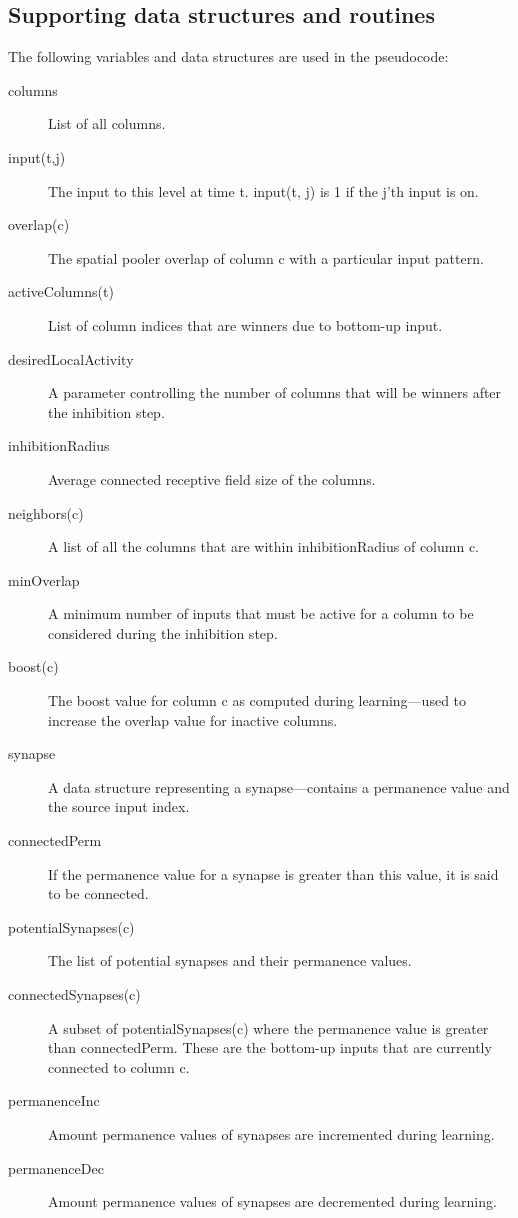 \documentclass{report}
\begin{document}
\subsection*{Supporting data structures and routines}

The following variables and data structures are used in the pseudocode:

\begin{description}
\item[columns] List of all columns.
\item[input(t,j)] The input to this level at time t. input(t, j) is 1
  if the j'th input is on.
\item[overlap(c)] The spatial pooler overlap of column c with a
  particular input pattern.
\item[activeColumns(t)] List of column indices that are winners due to
  bottom-up input.
\item[desiredLocalActivity] A parameter controlling the number of
  columns that will be winners after the inhibition step.
\item[inhibitionRadius] Average connected receptive field size of the
  columns.
\item[neighbors(c)] A list of all the columns that are within
  inhibitionRadius of column c.
\item[minOverlap] A minimum number of inputs that must be active for a
  column to be considered during the inhibition step.
\item[boost(c)] The boost value for column c as computed during
  learning---used to increase the overlap value for inactive columns.
\item[synapse] A data structure representing a synapse---contains a
  permanence value and the source input index.
\item[connectedPerm] If the permanence value for a synapse is greater
  than this value, it is said to be connected.
\item[potentialSynapses(c)] The list of potential synapses and their
  permanence values.
\item[connectedSynapses(c)] A subset of potentialSynapses(c) where the
  permanence value is greater than connectedPerm. These are the
  bottom-up inputs that are currently connected to column c.
\item[permanenceInc] Amount permanence values of synapses are
  incremented during learning.
\item[permanenceDec] Amount permanence values of synapses are
  decremented during learning.

\end{description}
\end{document}
